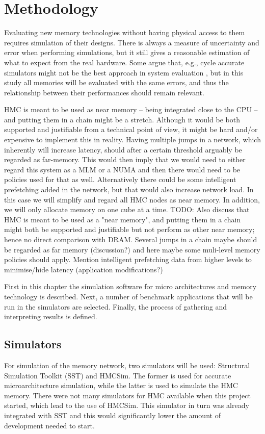 \chapter{Methodology}
Evaluating new memory technologies without having physical access to them requires simulation of their designs. There is always a measure of uncertainty and error when performing simulations, but it still gives a reasonable estimation of what to expect from the real hardware. Some argue that, e.g., cycle accurate simulators might not be the best approach in system evaluation \cite{weaver2008cycle}, but in this study all memories will be evaluated with the same errors, and thus the relationship between their performances should remain relevant. 
\bigskip

HMC is meant to be used as near memory -- being integrated close to the CPU -- and putting them in a chain might be a stretch. Although it would be both supported and justifiable from a technical point of view, it might be hard and/or expensive to implement this in reality. Having multiple jumps in a network, which inherently will increase latency, should after a certain threshold arguably be regarded as far-memory. This would then imply that we would need to either regard this system as a MLM or a NUMA and then there would need to be policies used for that as well. Alternatively there could be some intelligent prefetching added in the network, but that would also increase network load. In this case we will simplify and regard all HMC nodes as near memory. In addition, we will only allocate memory on one cube at a time.
TODO: Also discuss that HMC is meant to be used as a "near memory", and putting them in a chain might both be supported and justifiable but not perform as other near memory; hence no direct comparison with DRAM. Several jumps in a chain maybe should be regarded as far memory (discussion?) and here maybe some muli-level memory policies should apply. Mention intelligent prefetching data from higher levels to minimise/hide latency (application modifications?)
\bigskip

First in this chapter the simulation software for micro architectures and memory technology is described. Next, a number of benchmark applications that will be run in the simulators are selected. Finally, the process of gathering and interpreting results is defined.


\section{Simulators}
For simulation of the memory network, two simulators will be used: Structural Simulation Toolkit (SST) and HMCSim. The former is used for accurate microarchitecture simulation, while the latter is used to simulate the HMC memory. There were not many simulators for HMC available when this project started, which lead to the use of HMCSim. This simulator in turn was already integrated with SST and this would significantly lower the amount of development needed to start.

